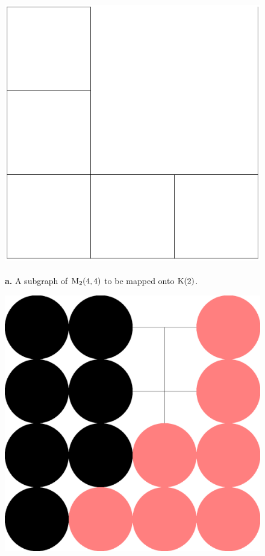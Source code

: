 \begin{itemize}
\begin{figure}[hbt]
{\includegraphics[scale=0.25]{s_f_out1.ps}
\hfill\ \\
{\bf a.} A subgraph of ${\rm M}_{2}(4,4)$ to be mapped onto ${\rm K}(2)$.
}\ \hfill\
\parbox[t]{4.5cm}{
\hfill
\includegraphics[scale=0.25]{s_f_out2.ps}
}
\end{figure}
\end{itemize}
